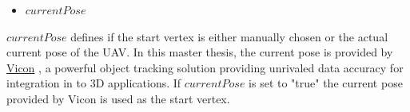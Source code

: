 \begin{itemize}
  \item $currentPose$
\end{itemize}


$currentPose$ defines if the start vertex is either manually chosen or the actual current pose of the UAV. In this master thesis, the current pose is provided by \href{http://www.vicon.com/}{Vicon} \cite{Vicon}, a powerful object tracking solution providing unrivaled data accuracy for integration in to 3D applications. If $currentPose$ is set to "true" the current pose provided by Vicon is used as the start vertex.







%
%
%
%
%
%
%
%
%

